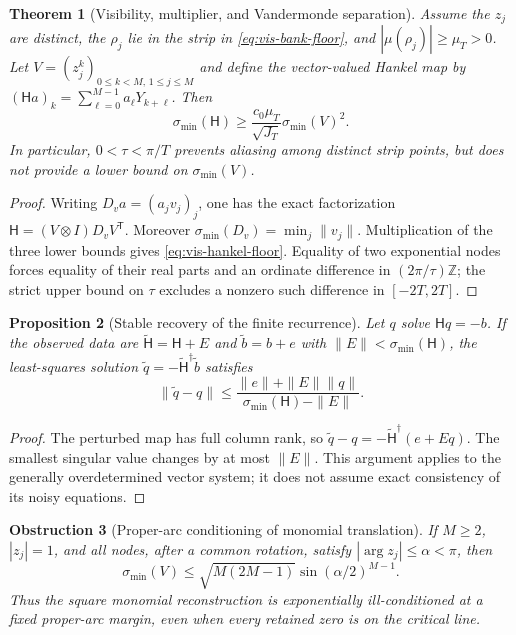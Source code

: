 \documentclass[11pt]{article}
\newtheorem{theorem}{Theorem}[section]
\newtheorem{proposition}[theorem]{Proposition}
\newtheorem{obstruction}[theorem]{Obstruction}
\theoremstyle{definition}
\theoremstyle{remark}
\newcommand{\Z}{\mathbb Z}
\begin{document}
\begin{theorem}[Visibility, multiplier, and Vandermonde separation]
\label{thm:vis-hankel}
Assume the $z_j$ are distinct, the $\rho_j$ lie in the strip in
\eqref{eq:vis-bank-floor}, and $|\mu(\rho_j)|\ge\mu_T>0$.
Let $V=(z_j^k)_{0\le k<M,\,1\le j\le M}$ and define the vector-valued
Hankel map by
$(\mathsf H a)_k=\sum_{\ell=0}^{M-1}a_\ell Y_{k+\ell}$.
Then
\begin{equation}
 \sigma_{\min}(\mathsf H)
 \ge \frac{c_0\mu_T}{\sqrt{J_T}}\sigma_{\min}(V)^2.
 \label{eq:vis-hankel-floor}
\end{equation}
In particular, $0<\tau<\pi/T$ prevents aliasing among distinct strip
points, but does not provide a lower bound on $\sigma_{\min}(V)$.
\end{theorem}

\begin{proof}
Writing $D_v a=(a_jv_j)_j$, one has the exact factorization
$\mathsf H=(V\otimes I)D_vV^{\mathsf T}$.
Moreover $\sigma_{\min}(D_v)=\min_j\|v_j\|$.
Multiplication of the three lower bounds gives
\eqref{eq:vis-hankel-floor}.  Equality of two exponential nodes forces
equality of their real parts and an ordinate difference in
$(2\pi/\tau)\Z$; the strict upper bound on $\tau$ excludes a nonzero
such difference in $[-2T,2T]$.
\end{proof}

\begin{proposition}[Stable recovery of the finite recurrence]
\label{prop:vis-recurrence-stability}
Let $q$ solve $\mathsf Hq=-b$.  If the observed data are
$\widetilde{\mathsf H}=\mathsf H+E$ and $\widetilde b=b+e$ with
$\|E\|<\sigma_{\min}(\mathsf H)$, the least-squares solution
$\widetilde q=-\widetilde{\mathsf H}^{\dagger}\widetilde b$ satisfies
\begin{equation}
 \|\widetilde q-q\|
 \le\frac{\|e\|+\|E\|\|q\|}
 {\sigma_{\min}(\mathsf H)-\|E\|}.
 \label{eq:vis-recurrence-stability}
\end{equation}
\end{proposition}

\begin{proof}
The perturbed map has full column rank, so
$\widetilde q-q=-\widetilde{\mathsf H}^{\dagger}(e+Eq)$.
The smallest singular value changes by at most $\|E\|$.
This argument applies to the generally overdetermined vector system;
it does not assume exact consistency of its noisy equations.
\end{proof}

\begin{obstruction}[Proper-arc conditioning of monomial translation]
\label{obs:vis-proper-arc}
If $M\ge2$, $|z_j|=1$, and all nodes, after a common rotation, satisfy
$|\arg z_j|\le\alpha<\pi$, then
\begin{equation}
 \sigma_{\min}(V)
 \le\sqrt{M(2M-1)}\sin(\alpha/2)^{M-1}.
 \label{eq:vis-proper-arc}
\end{equation}
Thus the square monomial reconstruction is exponentially ill-conditioned
at a fixed proper-arc margin, even when every retained zero is on the
critical line.
\end{obstruction}
\end{document}
